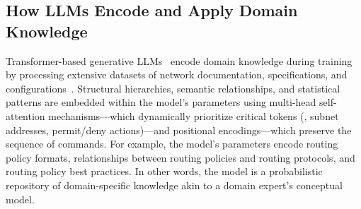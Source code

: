     


\subsection{How LLMs Encode and Apply Domain Knowledge}

 Transformer-based generative LLMs~\cite{vaswani2017attention,hill2024transformers,lin2022survey} encode domain knowledge during training by processing extensive datasets of network documentation, specifications, and configurations~\cite{qiu2020pre,achiam2023gpt,touvron2023llama,brown2020language}. 
Structural hierarchies, semantic relationships, and statistical patterns are embedded within the model’s parameters using multi-head self-attention mechanisms---which dynamically prioritize critical tokens (\eg, subnet addresses, permit/deny actions)---and positional encodings---which preserve the sequence of commands. For example, the model's parameters encode routing policy formats, relationships between routing policies and routing protocols, and routing policy best practices. In other words, the model is a probabilistic repository of domain-specific knowledge akin to a domain expert's conceptual model.


